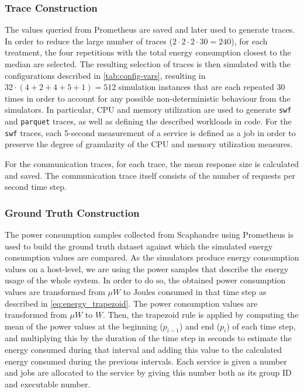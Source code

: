 \subsubsection{Trace Construction}
The values queried from Prometheus are saved and later used to generate traces. In order to reduce the large number of traces ($2 \cdot 2 \cdot 2 \cdot 30 = 240$), for each treatment, the four repetitions with the total energy consumption closest to the median are selected. The resulting selection of traces is then simulated with the configurations described in \autoref{tab:config-vars}, resulting in $32 \cdot (4 + 2 + 4 + 5 + 1) = 512$ simulation instances that are each repeated 30 times in order to account for any possible non-deterministic behaviour from the simulators. In particular, CPU and memory utilization are used to generate \texttt{swf} and \texttt{parquet} traces, as well as defining the described workloads in code. For the \texttt{swf} traces, each 5-second measurement of a service is defined as a job in order to preserve the degree of granularity of the CPU and memory utilization measures.

For the communication traces, for each trace, the mean response size is calculated and saved. The communication trace itself consists of the number of requests per second time step.

\subsubsection{Ground Truth Construction}
The power consumption samples collected from Scaphandre using Prometheus is used to build the ground truth dataset against which the simulated energy consumption values are compared. As the simulators produce energy consumption values on a host-level, we are using the power samples that describe the energy usage of the whole system. In order to do so, the obtained power consumption values are transformed from $\mu W$ to Joules consumed in that time step as described in \autoref{eq:energy_trapezoid}. The power consumption values are transformed from $\mu W$ to $W$. Then, the trapezoid rule is applied by computing the mean of the power values at the beginning ($p_{i-1}$) and end ($p_i$) of each time step, and multiplying this by the duration of the time step in seconds to estimate the energy consumed during that interval and adding this value to the calculated energy consumed during the previous intervals. Each service is given a number and jobs are allocated to the service by giving this number both as its group ID and executable number.

